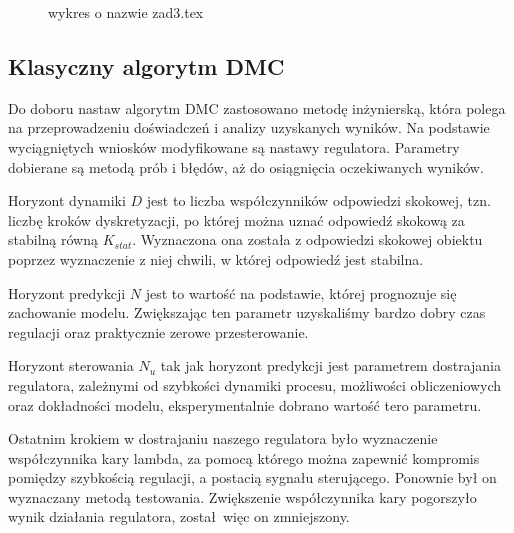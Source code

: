\begin{figure}[H] 
    \centering
    
    \caption{wykres o nazwie zad3.tex}
    \label{projekt:zad4:figure}
\end{figure}

%     

%     


\subsection{Klasyczny algorytm DMC}
\label{projekt:zad4:DMC}

Do doboru nastaw algorytm DMC zastosowano metodę inżynierską, 
która polega na przeprowadzeniu doświadczeń i analizy uzyskanych wyników. 
Na podstawie wyciągniętych wniosków modyfikowane są nastawy regulatora. 
Parametry  dobierane są metodą prób i błędów, aż do osiągnięcia oczekiwanych wyników.

\indent Horyzont dynamiki $D$ jest to liczba współczynników odpowiedzi skokowej, 
tzn. liczbę kroków dyskretyzacji, po której można uznać odpowiedź skokową za stabilną równą $K_{stat}$. 
Wyznaczona ona została z odpowiedzi skokowej obiektu poprzez wyznaczenie z niej chwili, 
w której odpowiedź jest stabilna.

\indent Horyzont predykcji $N$ jest to wartość na podstawie, 
której prognozuje się zachowanie modelu. 
Zwiększając ten parametr uzyskaliśmy bardzo dobry czas regulacji oraz praktycznie zerowe przesterowanie.

\indent Horyzont sterowania $N_{u}$ tak jak horyzont predykcji jest parametrem dostrajania regulatora, 
zależnymi od szybkości dynamiki procesu, możliwości obliczeniowych oraz dokładności modelu, 
eksperymentalnie dobrano wartość tero parametru.

Ostatnim krokiem w dostrajaniu naszego regulatora było wyznaczenie współczynnika kary lambda, 
za pomocą którego można zapewnić kompromis pomiędzy szybkością regulacji, a postacią sygnału sterującego. 
Ponownie był on wyznaczany metodą testowania. 
Zwiększenie współczynnika kary pogorszyło wynik działania regulatora, został więc on zmniejszony.

